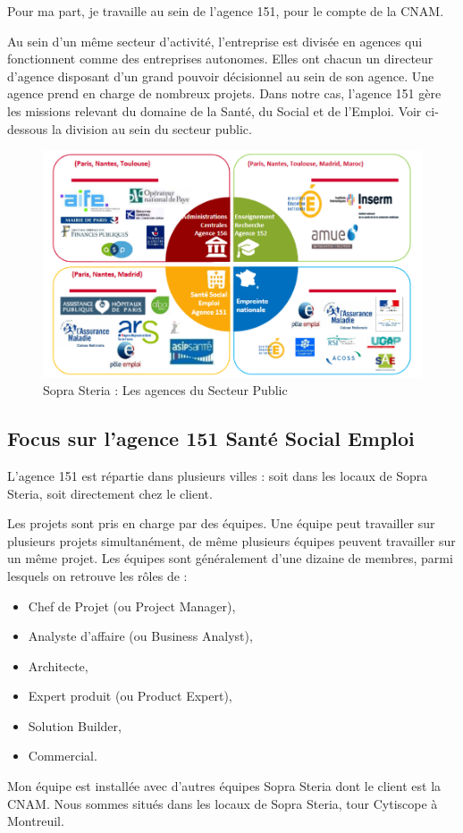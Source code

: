 Pour ma part, je travaille au sein de l’agence 151, pour le compte de la CNAM.

Au sein d'un même secteur d'activité, l'entreprise est divisée en agences qui fonctionnent comme des entreprises autonomes. Elles ont chacun un directeur d'agence disposant d'un grand pouvoir décisionnel au sein de son agence. Une agence prend en charge de nombreux projets. Dans notre cas, l'agence 151 gère les missions relevant du domaine de la Santé, du Social et de l’Emploi.
Voir ci-dessous la division au sein du secteur public.

\begin{figure}[!h]
\centering
\includegraphics[width=1\textwidth]{images/divisionSecteurPublic.png}
\caption{Sopra Steria : Les agences du Secteur Public}
\end{figure}

\subsection{Focus sur l'agence 151 Santé Social Emploi}

L'agence 151 est répartie dans plusieurs villes : soit dans les locaux de Sopra Steria, soit directement chez le client.

Les projets sont pris en charge par des équipes. Une équipe peut travailler sur plusieurs projets simultanément, de même plusieurs équipes peuvent travailler sur un même projet. Les équipes sont généralement d’une dizaine de membres, parmi lesquels on retrouve les rôles de :
\begin{itemize}
    \item Chef de Projet (ou Project Manager),
    \item Analyste d’affaire (ou Business Analyst),
    \item Architecte,
    \item Expert produit (ou Product Expert),
    \item Solution Builder,
    \item Commercial.
\end{itemize}
Mon équipe est installée avec d'autres équipes Sopra Steria dont le client est la CNAM. Nous sommes situés dans les locaux de Sopra Steria, tour Cytiscope à Montreuil. 

